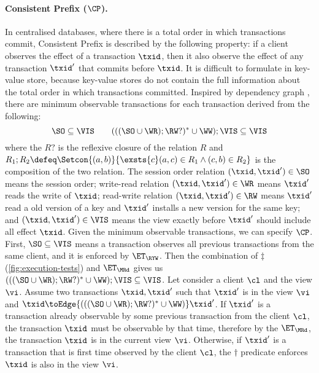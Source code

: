 \paragraph{Consistent Prefix ($\CP$).}
\label{para:cp}
In centralised databases, where there is a total order in which transactions commit, 
Consistent Prefix is described by the following property: 
if a client observes the effect of a transaction $\txid$,
then it also observe the effect of any transaction $\txid'$ that commits before $\txid$.
It is difficult to formulate in key-value store,
because key-value stores do not contain the full information about the total order in which transactions committed. 
Inspired by dependency graph \cite{.....},
there are minimum observable transactions for each transaction derived from the following:
\[
    \SO  \subseteq  \VIS \qquad
    ( ( ( \SO \cup \WR ) ; \RW? )^* \cup \WW ) ; \VIS \subseteq \VIS
\]
where the \( R? \) is the reflexive closure of the relation \( R \) 
and \( R_1 ; R_2 \defeq \Setcon{(a,b)}{\exsts{c} (a,c) \in R_1 \land (c,b) \in R_2 } \) is the composition of the two relation.
The session order relation \( (\txid, \txid') \in \SO \) means the session order;
write-read relation \( (\txid, \txid') \in \WR \) means \( \txid' \) reads the write of \( \txid \);
read-write relation \( (\txid, \txid') \in \RW \) means \( \txid' \) read a old version of a key 
and \( \txid' \) installs a new version for the same key;
and \( (\txid, \txid') \in \VIS \) means the view exactly before \( \txid' \) should include all effect \( \txid \).
Given the minimum observable transactions, we can specify $\CP$. 
First, \( \SO \subseteq \VIS \) means a transaction observes all previous transactions from the same client,
and it is enforced by \( \ET_\RYW \).
Then the combination of \( \ddagger\) (\cref{fig:execution-tests}) and \( \ET_\MRd \) gives us \( ( ( ( \SO \cup \WR ) ; \RW? )^* \cup \WW ) ; \VIS \subseteq \VIS \).
Let consider a client \( \cl \) and the view \( \vi \).
Assume two transactions \( \txid, \txid' \)  such that \( \txid' \) is in the view \( \vi \) and \( \txid \toEdge{( ( ( \SO \cup \WR ) ; \RW? )^* \cup \WW )} \txid' \).
If \( \txid' \) is a transaction already observable by some previous transaction from the client \( \cl \), 
the transaction \( \txid \) must be observable by that time,
therefore by the \( \ET_\MRd \), the transaction \( \txid \) is in the current view \( \vi \).
Otherwise, if \( \txid' \) is a transaction that is first time observed by the client \( \cl \),
the \( \dagger \) predicate enforces \( \txid \) is also in the view \( \vi \).
